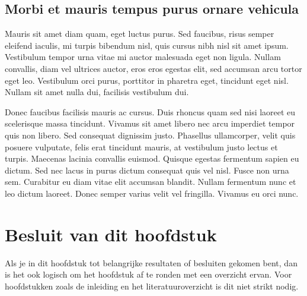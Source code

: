 \subsection{Morbi et mauris tempus purus ornare vehicula}
Mauris sit amet diam quam, eget luctus purus. Sed faucibus, risus semper
eleifend iaculis, mi turpis bibendum nisl, quis cursus nibh nisl sit amet
ipsum. Vestibulum tempor urna vitae mi auctor malesuada eget non ligula.
Nullam convallis, diam vel ultrices auctor, eros eros egestas elit, sed
accumsan arcu tortor eget leo. Vestibulum orci purus, porttitor in pharetra
eget, tincidunt eget nisl. Nullam sit amet nulla dui, facilisis vestibulum
dui.

Donec faucibus facilisis mauris ac cursus. Duis rhoncus quam sed nisi
laoreet eu scelerisque massa tincidunt. Vivamus sit amet libero nec arcu
imperdiet tempor quis non libero. Sed consequat dignissim justo. Phasellus
ullamcorper, velit quis posuere vulputate, felis erat tincidunt mauris, at
vestibulum justo lectus et turpis. Maecenas lacinia convallis euismod.
Quisque egestas fermentum sapien eu dictum. Sed nec lacus in purus dictum
consequat quis vel nisl. Fusce non urna sem. Curabitur eu diam vitae elit
accumsan blandit. Nullam fermentum nunc et leo dictum laoreet. Donec semper
varius velit vel fringilla. Vivamus eu orci nunc.

\section{Besluit van dit hoofdstuk}
Als je in dit hoofdstuk tot belangrijke resultaten of besluiten gekomen
bent, dan is het ook logisch om het hoofdstuk af te ronden met een
overzicht ervan. Voor hoofdstukken zoals de inleiding en het
literatuuroverzicht is dit niet strikt nodig.

